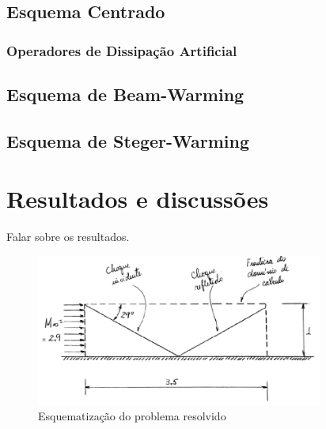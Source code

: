 \documentclass[a4paper, twoside, 12pt]{article}
\numberwithin{equation}{section}
\begin{document}
\subsection{Esquema Centrado}

\subsubsection{Operadores de Dissipação Artificial}

\subsection{Esquema de Beam-Warming}

\subsection{Esquema de Steger-Warming}


\section{Resultados e discussões}
Falar sobre os resultados.
        \begin{figure}[htb]
            \centering
            \includegraphics[width=.7\linewidth,height=50mm]{pics/shock.png}
            \caption{Esquematização do problema resolvido \cite{AZEVEDO}}
            \vspace*{-5pt}
        \end{figure}
\end{document}
